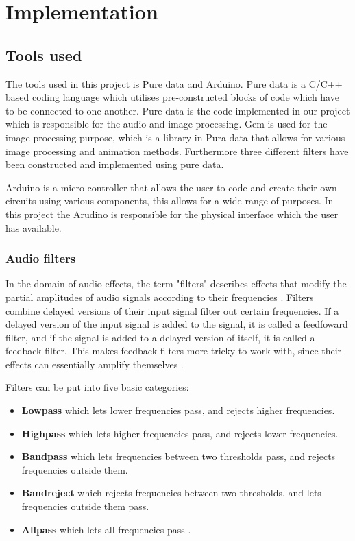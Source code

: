 \chapter{Implementation}\label{ch:implementation}

\section{Tools used}\label{sec:toolsused}
The tools used in this project is Pure data and Arduino. 
Pure data is a C/C++ based coding language which utilises pre-constructed blocks of code which have to be connected to one another. Pure data is the code implemented in our project which is responsible for the audio and image processing. Gem is used for the image processing purpose, which is a library in Pura data that allows for various image processing and animation methods.  
Furthermore three different filters have been constructed and implemented using pure data.

Arduino is a micro controller that allows the user to code and create their own circuits using various components, this allows for a wide range of purposes. In this project the Arudino is responsible for the physical interface which the user has available. 

\subsection{Audio filters}
In the domain of audio effects, the term "filters" describes effects that modify the partial amplitudes of audio signals according to their frequencies \cite{zolzer2011dafx}. Filters combine delayed versions of their input signal filter out certain frequencies. If a delayed version of the input signal is added to the signal, it is called a feedfoward filter, and if the signal is added to a delayed version of itself, it is called a feedback filter. This makes feedback filters more tricky to work with, since their effects can essentially amplify themselves \cite{steiglitz1997digital}.

Filters can be put into five basic categories:
\begin{itemize}
\item \textbf{Lowpass} which lets lower frequencies pass, and rejects higher frequencies.
\item \textbf{Highpass} which lets higher frequencies pass, and rejects lower frequencies.
\item \textbf{Bandpass} which lets frequencies between two thresholds pass, and rejects frequencies outside them.
\item \textbf{Bandreject} which rejects frequencies between two thresholds, and lets frequencies outside them pass.
\item \textbf{Allpass} which lets all frequencies pass \cite{zolzer2011dafx}.
\end{itemize}

